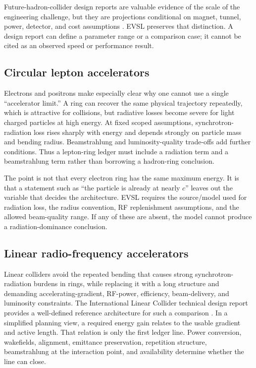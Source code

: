 \documentclass[conference]{../../../../Conference-LaTeX-template_10-17-19/IEEEtran}
\begin{document}
Future-hadron-collider design reports are valuable evidence of the scale of the engineering challenge, but they are projections conditional on magnet, tunnel, power, detector, and cost assumptions \cite{abada2019}. EVSL preserves that distinction. A design report can define a parameter range or a comparison case; it cannot be cited as an observed speed or performance result.

\subsection{Circular lepton accelerators}
Electrons and positrons make especially clear why one cannot use a single ``accelerator limit.'' A ring can recover the same physical trajectory repeatedly, which is attractive for collisions, but radiative losses become severe for light charged particles at high energy. At fixed scoped assumptions, synchrotron-radiation loss rises sharply with energy and depends strongly on particle mass and bending radius. Beamstrahlung and luminosity-quality trade-offs add further conditions. Thus a lepton-ring ledger must include a radiation term and a beamstrahlung term rather than borrowing a hadron-ring conclusion.

The point is not that every electron ring has the same maximum energy. It is that a statement such as ``the particle is already at nearly $c$'' leaves out the variable that decides the architecture. EVSL requires the source/model used for radiation loss, the radius convention, RF replenishment assumptions, and the allowed beam-quality range. If any of these are absent, the model cannot produce a radiation-dominance conclusion.

\subsection{Linear radio-frequency accelerators}
Linear colliders avoid the repeated bending that causes strong synchrotron-radiation burdens in rings, while replacing it with a long structure and demanding accelerating-gradient, RF-power, efficiency, beam-delivery, and luminosity constraints. The International Linear Collider technical design report provides a well-defined reference architecture for such a comparison \cite{behnke2013}. In a simplified planning view, a required energy gain relates to the usable gradient and active length. That relation is only the first ledger line. Power conversion, wakefields, alignment, emittance preservation, repetition structure, beamstrahlung at the interaction point, and availability determine whether the line can close.
\end{document}
